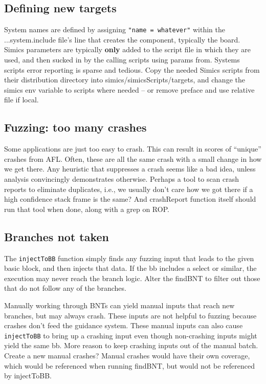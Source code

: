 \documentclass[titlepage]{article}
\begin{document}
\begin{appendices}
\subsection{Defining new targets}
System names are defined by assigning {\tt "name = whatever"} within the ...system.include file's line that creates the component, typically the board.
Simics parameters are typically \textbf{only} added to the script file in which they are used, and then sucked in by the calling scripts using params from.
Systems scripts error reporting is sparse and tedious.   Copy the needed Simics scripts from their distribution directory into simics/simicsScripts/targets,
and change the simics env variable to scripts where needed -- or remove preface and use relative file if local. 

\subsection{Fuzzing: too many crashes}
Some applications are just too easy to crash.  This can result in scores of ``unique'' crashes from AFL.  Often, these are all the same
crash with a small change in how we get there.  Any heuristic that suppresses a crash seems like a bad idea, unless analysis convincingly demonstrates otherwise.
Perhaps a tool to scan crash reports to eliminate duplicates, i.e., we usually don't care how we got there if a high confidence stack frame is the same?
And crashReport function itself should run that tool when done, along with a grep on ROP.

\subsection{Branches not taken}
The {\tt injectToBB} function simply finds any fuzzing input that leads to the given basic block, and then injects that data.
If the bb includes a select or similar, the execution may never reach the branch logic.  Alter the findBNT to filter out those that do not
follow any of the branches.

Manually working through BNTs can yield manual inputs that reach new branches, but may always crash.  These inputs are not helpful to fuzzing because crashes don't 
feed the guidance system.  These manual inputs can also cause {\tt injectToBB} to bring up a crashing input even though non-crashing inputs might yield the same bb.
More reason to keep crashing inputs out of the manual batch.  Create a new manual crashes?  Manual crashes would have their own coverage, which would be referenced
when running findBNT, but would not be referenced by injectToBB.


\end{appendices}
\end{document}
